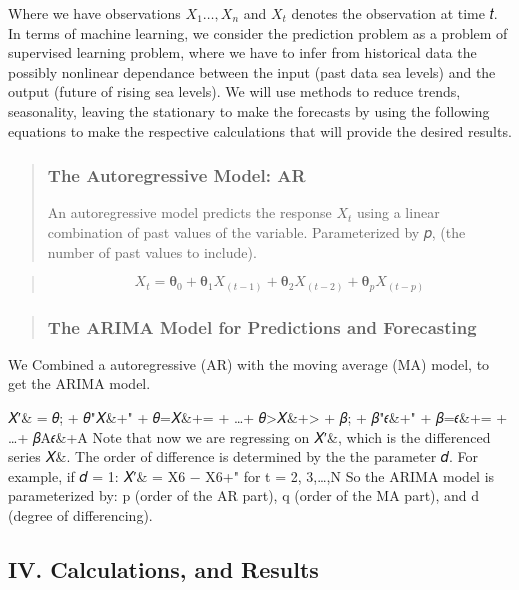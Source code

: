 \documentclass[11pt]{article}
\begin{document}
Where we have observations \(X_1\ldots,X_n\) and \(X_t\) denotes the
observation at time 𝑡. In terms of machine learning, we consider the
prediction problem as a problem of supervised learning problem, where we
have to infer from historical data the possibly nonlinear dependance
between the input (past data sea levels) and the output (future of
rising sea levels). We will use methods to reduce trends, seasonality,
leaving the stationary to make the forecasts by using the following
equations to make the respective calculations that will provide the
desired results.

\begin{quote}
\subsubsection{The Autoregressive Model:
AR}\label{the-autoregressive-model-ar}

An autoregressive model predicts the response \(X_t\) using a linear
combination of past values of the variable. Parameterized by 𝑝, (the
number of past values to include).
\end{quote}

\begin{quote}
\[X_t = \mathbf\theta_0 + \mathbf\theta_1 X_(t-1) + \mathbf\theta_2 X_(t-2) + \mathbf\theta_p X_(t-p)\]
\end{quote}

\begin{quote}
\subsubsection{The ARIMA Model for Predictions and
Forecasting}\label{the-arima-model-for-predictions-and-forecasting}
\end{quote}

We Combined a autoregressive (AR) with the moving average (MA) model, to
get the ARIMA model.

𝑋′\& = 𝜃; + 𝜃"𝑋\&+" + 𝜃=𝑋\&+= + \ldots{}+
𝜃\textgreater{}𝑋\&+\textgreater{} + 𝛽; + 𝛽"𝜖\&+" + 𝛽=𝜖\&+= + \ldots{}+
𝛽A𝜖\&+A Note that now we are regressing on 𝑋′\&, which is the
differenced series 𝑋\&. The order of difference is determined by the the
parameter 𝑑. For example, if 𝑑 = 1: 𝑋′\& = X6 − X6+" for t = 2,
3,\ldots{},N So the ARIMA model is parameterized by: p (order of the AR
part), q (order of the MA part), and d (degree of differencing).

    \subsection{IV. Calculations, and
Results}\label{iv.-calculations-and-results}
\end{document}
